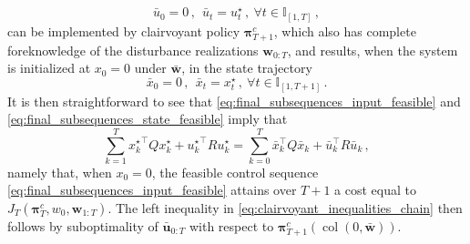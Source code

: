 \documentclass[conference]{IEEEtran}
\begin{document}
    \begin{equation}
        \label{eq:final_subsequences_input_feasible}
        \bar{u}_0 = 0\,, ~~ \bar{u}_t = u_t^\star\,, ~ \forall t \in \mathbb{I}_{[1, T]}\,,
    \end{equation}
    can be implemented by clairvoyant policy $\bm{\pi}_{T+1}^c$, which also has complete foreknowledge of the disturbance realizations $\mathbf{w}_{0:T}$, and results, when the system is initialized at $x_0 = 0$ under $\bar{\mathbf{w}}$, in the state trajectory
    \begin{equation}
        \label{eq:final_subsequences_state_feasible}
        \bar{x}_0 = 0\,, ~~ \bar{x}_t = x_t^\star\,, ~ \forall t \in \mathbb{I}_{[1, T+1]}\,.
    \end{equation}
    It is then straightforward to see that
    \eqref{eq:final_subsequences_input_feasible} and \eqref{eq:final_subsequences_state_feasible} imply that
    \begin{equation*}
        \sum_{k = 1}^{T} {x^\star_k}^\top Q x^\star_k + {u^\star_k}^\top R u_k^\star =
        \sum_{k = 0}^{T} \bar{x}_k^\top Q \bar{x}_k + \bar{u}_k^\top R \bar{u}_k\,,
    \end{equation*}
    namely that, when $x_0 = 0$, the feasible control sequence \eqref{eq:final_subsequences_input_feasible} attains over $T+1$ a cost equal to $J_{T}(\bm{\pi}_{T}^c, w_{0}, \mathbf{w}_{1:T})$. The left inequality in \eqref{eq:clairvoyant_inequalities_chain} then follows by suboptimality of $\bar{\mathbf{u}}_{0:T}$ with respect to $\bm{\pi}_{T+1}^c(\operatorname{col}(0, \bar{\mathbf{w}}))$.
\end{document}
